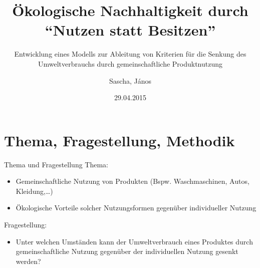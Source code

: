 \documentclass[beamer, xcolor=table]{beamer}
\title{Ökologische Nachhaltigkeit durch \\ \enquote{Nutzen statt Besitzen}}
\subtitle{{\small Entwicklung eines Modells zur Ableitung von Kriterien für die Senkung des Umweltverbrauchs durch gemeinschaftliche Produktnutzung}}
\author{Sascha, János}
\date{29.04.2015}
\begin{document}
\frame{\titlepage}


\section{Thema, Fragestellung, Methodik}

	\begin{frame}{Thema und Fragestellung}
        Thema: 
        \begin{itemize}
            \item Gemeinschaftliche Nutzung von Produkten (Bspw. Waschmaschinen,
                Autos, Kleidung,\dots)
            \item Ökologische Vorteile solcher Nutzungsformen gegenüber
                individueller Nutzung
        \end{itemize}

        \begin{block}{Fragestellung:}
            \begin{itemize}
                \item Unter welchen Umständen kann der Umweltverbrauch eines Produktes durch gemeinschaftliche Nutzung gegenüber der individuellen Nutzung gesenkt werden?
            \end{itemize}
        \end{block}
	\end{frame}
	
\end{document}
